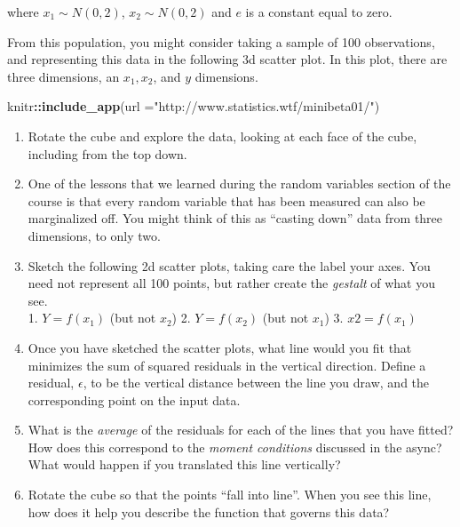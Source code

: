 \documentclass[
]{book}
\newenvironment{Shaded}{\begin{snugshade}}{\end{snugshade}}
\newcommand{\AttributeTok}[1]{\textcolor[rgb]{0.13,0.29,0.53}{#1}}
\newcommand{\FunctionTok}[1]{\textcolor[rgb]{0.13,0.29,0.53}{\textbf{#1}}}
\newcommand{\NormalTok}[1]{#1}
\newcommand{\SpecialCharTok}[1]{\textcolor[rgb]{0.81,0.36,0.00}{\textbf{#1}}}
\newcommand{\StringTok}[1]{\textcolor[rgb]{0.31,0.60,0.02}{#1}}
\providecommand{\tightlist}{%
  \setlength{\itemsep}{0pt}\setlength{\parskip}{0pt}}
\theoremstyle{definition}
\theoremstyle{definition}
\theoremstyle{definition}
\theoremstyle{definition}
\theoremstyle{remark}
\begin{document}
where \(x_1 \sim N(0,2)\), \(x_2 \sim N(0,2)\) and \(e\) is a constant equal to zero.

From this population, you might consider taking a sample of 100 observations, and representing this data in the following 3d scatter plot. In this plot, there are three dimensions, an \(x_1, x_2\), and \(y\) dimensions.

\begin{Shaded}
\begin{Highlighting}[]
\NormalTok{knitr}\SpecialCharTok{::}\FunctionTok{include\_app}\NormalTok{(}\AttributeTok{url =}\StringTok{"http://www.statistics.wtf/minibeta01/"}\NormalTok{)}
\end{Highlighting}
\end{Shaded}

\begin{enumerate}
\def\labelenumi{\arabic{enumi}.}
\tightlist
\item
  Rotate the cube and explore the data, looking at each face of the cube, including from the top down.
\item
  One of the lessons that we learned during the random variables section of the course is that every random variable that has been measured can also be marginalized off. You might think of this as ``casting down'' data from three dimensions, to only two.
\item
  Sketch the following 2d scatter plots, taking care the label your axes. You need not represent all 100 points, but rather create the \emph{gestalt} of what you see.\\
  1. \(Y = f(x_1)\) (but not \(x_2\))
  2. \(Y = f(x_2)\) (but not \(x_1\))
  3. \(x2 = f(x_1)\)
\item
  Once you have sketched the scatter plots, what line would you fit that minimizes the sum of squared residuals in the vertical direction. Define a residual, \(\epsilon\), to be the vertical distance between the line you draw, and the corresponding point on the input data.
\item
  What is the \emph{average} of the residuals for each of the lines that you have fitted? How does this correspond to the \emph{moment conditions} discussed in the async? What would happen if you translated this line vertically?
\item
  Rotate the cube so that the points ``fall into line''. When you see this line, how does it help you describe the function that governs this data?
\end{enumerate}
\end{document}
